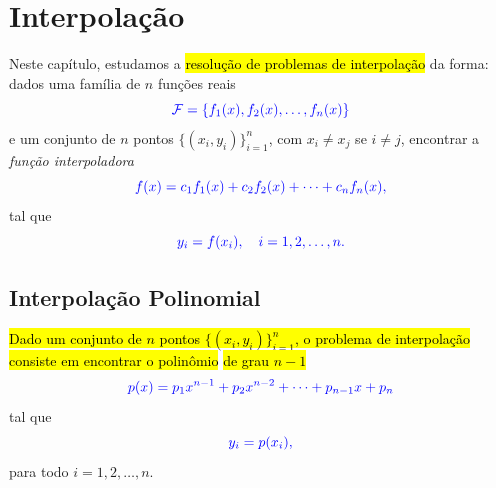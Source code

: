 

\chapter{Interpolação}\label{cap_interp}

Neste capítulo, estudamos a \hl{resolução de problemas de interpolação} da forma: dados uma família de $n$ funções reais
\begin{equation}\color{blue}\mathcal{F} = \{f_1(x), f_2(x), \dotsc, f_n(x)\}
\end{equation}
e um conjunto de $n$ pontos $\{(x_i, y_i)\}_{i=1}^n$, com $x_i\neq x_j$ se $i\neq j$, encontrar a \emph{função interpoladora}
\begin{equation}\color{blue}f(x) = c_1f_1(x) + c_2f_2(x) + \cdots + c_nf_n(x),
\end{equation}
tal que
\begin{equation}\color{blue}y_i = f(x_i),\quad i=1, 2, \ldots, n.
\end{equation}

\section{Interpolação Polinomial}\label{cap_interp_sec_interpoli}

\hl{Dado um conjunto de $n$ pontos $\{(x_i, y_i)\}_{i=1}^n$, o problema de interpolação consiste em encontrar o polinômio} \hl{de grau $n-1$}
\begin{equation}\label{cap_interp_sec_interpoli:eq:interpoli_poli}\color{blue}p(x) = p_1x^{n-1} + p_2x^{n-2} + \cdots + p_{n-1}x + p_n
\end{equation}
tal que
\begin{equation}\label{cap_interp_sec_interpoli:eq:interpoli_conds}\color{blue}y_i = p(x_i),
\end{equation}
para todo $i=1, 2, \dotsc, n$.

